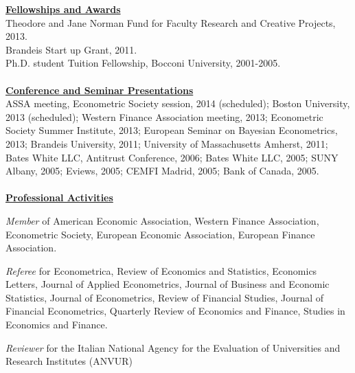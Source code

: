 \documentclass[12pt]{article}
\begin{document}
\underline{\textbf{Fellowships and Awards}}\\
Theodore and Jane Norman Fund for Faculty Research and Creative Projects, 2013. \\
Brandeis Start up Grant, 2011. \\
Ph.D. student Tuition Fellowship, Bocconi University, 2001-2005.\\ \\
\underline{\textbf{Conference and Seminar Presentations}}\\
ASSA meeting, Econometric Society session, 2014 (scheduled); Boston University, 2013 (scheduled); Western Finance Association meeting, 2013; Econometric Society Summer Institute, 2013; European Seminar on Bayesian Econometrics, 2013; Brandeis University, 2011; University of Massachusetts Amherst, 2011; Bates White LLC, Antitrust Conference, 2006; Bates White LLC, 2005; SUNY Albany, 2005; Eviews, 2005; CEMFI Madrid, 2005; Bank of Canada, 2005.\\ \\
\underline{\textbf{Professional Activities}}
\begin{description}
	\item\emph{Member} of American Economic Association, Western Finance Association, Econometric Society, European Economic Association, European Finance Association.

\item \emph{Referee} for Econometrica, Review of Economics and Statistics, Economics Letters, Journal of Applied Econometrics, Journal of Business and Economic Statistics, Journal of Econometrics, Review of Financial Studies, Journal of Financial Econometrics, Quarterly Review of Economics and Finance, Studies in Economics and Finance.

\item \emph{Reviewer} for the Italian National Agency for the Evaluation of Universities and Research Institutes (ANVUR) 
\end{description}
 
\end{document}
